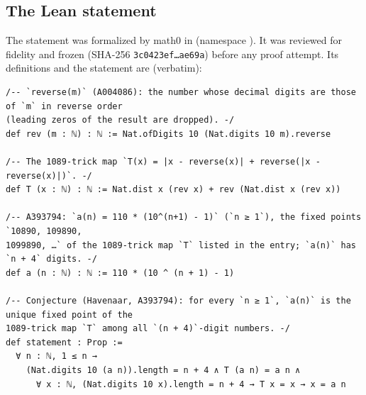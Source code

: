 \documentclass[11pt]{amsart}
\theoremstyle{plain}
\theoremstyle{definition}
\begin{document}
\subsection{The Lean statement}
The statement was formalized by math0 in  (namespace ). It was reviewed for fidelity and frozen (SHA-256 \texttt{3c0423ef\dots ae69a}) before any proof attempt. Its definitions and the statement are (verbatim):
\begin{lstlisting}
/-- `reverse(m)` (A004086): the number whose decimal digits are those of `m` in reverse order
(leading zeros of the result are dropped). -/
def rev (m : ℕ) : ℕ := Nat.ofDigits 10 (Nat.digits 10 m).reverse

/-- The 1089-trick map `T(x) = |x - reverse(x)| + reverse(|x - reverse(x)|)`. -/
def T (x : ℕ) : ℕ := Nat.dist x (rev x) + rev (Nat.dist x (rev x))

/-- A393794: `a(n) = 110 * (10^(n+1) - 1)` (`n ≥ 1`), the fixed points `10890, 109890,
1099890, …` of the 1089-trick map `T` listed in the entry; `a(n)` has `n + 4` digits. -/
def a (n : ℕ) : ℕ := 110 * (10 ^ (n + 1) - 1)

/-- Conjecture (Havenaar, A393794): for every `n ≥ 1`, `a(n)` is the unique fixed point of the
1089-trick map `T` among all `(n + 4)`-digit numbers. -/
def statement : Prop :=
  ∀ n : ℕ, 1 ≤ n →
    (Nat.digits 10 (a n)).length = n + 4 ∧ T (a n) = a n ∧
      ∀ x : ℕ, (Nat.digits 10 x).length = n + 4 → T x = x → x = a n
\end{lstlisting}
\end{document}
